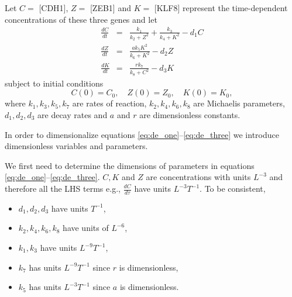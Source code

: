 \documentclass[10pt,letterpaper]{article}
\begin{document}
Let $C=$ [CDH1], $Z=$ [ZEB1] and $K=$ [KLF8] represent the time-dependent concentrations of these three genes and let
\begin{eqnarray}
\frac{dC}{dt} &=& \frac{k_1}{k_2 + Z^2} + \frac{k_3}{k_4 + K^2} - d_1 C  \label{eq:de_one} \\
\frac{dZ}{dt} &=& \frac{a k_5 K^2}{k_6 + K^2} - d_2 Z \label{eq:de_two} \\
\frac{dK}{dt} &=& \frac{r k_7}{k_8 + C^2} - d_3 K \label{eq:de_three}
\end{eqnarray}
subject to initial conditions
\begin{equation}
\label{eq:de_ics}
C(0) = C_0, \quad Z(0) = Z_0, \quad K(0) = K_0,
\end{equation}
where $k_1, k_3, k_5, k_7$ are rates of reaction, $k_2, k_4, k_6, k_8$ are Michaelis parameters, $d_1, d_2, d_3$ are decay rates and $a$ and $r$ are dimensionless constants.


\bigskip
{}

In order to dimensionalize equations \eqref{eq:de_one}--\eqref{eq:de_three} we introduce dimensionless variables and parameters.

\bigskip
{}

We first need to determine the dimensions of parameters in equations \eqref{eq:de_one}--\eqref{eq:de_three}. $C, K$ and $Z$ are concentrations with units $L^{-3}$ and therefore all the LHS terms e.g., $\frac{dC}{d\tau}$ have units $L^{-3} T^{-1}$. To be consistent,

\begin{itemize}
  \item $d_1, d_2, d_3$ have units $T^{-1}$,
  \item $k_2, k_4, k_6, k_8$ have units of $L^{-6}$, %
  \item $k_1, k_3$ have units $L^{-9} T^{-1}$,
  \item $k_7$ has units $L^{-9} T^{-1}$ since $r$ is dimensionless,
  \item $k_5$ has units $L^{-3}T^{-1}$  since $a$ is dimensionless.
\end{itemize}


\bigskip
{}
\end{document}
